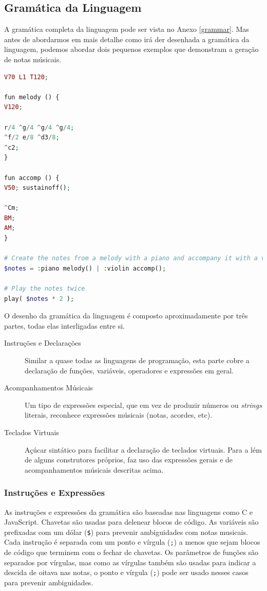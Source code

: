\subsection{Gramática da Linguagem}
A gramática completa da linguagem pode ser vista no Anexo \ref{grammar}. Mas antes de abordarmos em mais detalhe como irá der desenhada a gramática da linguagem, podemos abordar dois pequenos exemplos que demonstram a geração de notas músicais.
\begin{lstlisting}[caption=Exemplo da sintaxe proposta da linguagem,language=PHP]
V70 L1 T120;

fun melody () {
V120;

r/4 ^g/4 ^g/4 ^g/4;
^f/2 e/8 ^d3/8; 
^c2;
}

fun accomp () {
V50; sustainoff();

^Cm;
BM; 
AM;
}

# Create the notes from a melody with a piano and accompany it with a violin in parallel
$notes = :piano melody() | :violin accomp();

# Play the notes twice
play( $notes * 2 );
\end{lstlisting}

O desenho da gramática da linguagem é composto aproximadamente por três partes, todas elas interligadas entre si.
\begin{description}
    \item[Instruções e Declarações] Similar a quase todas as linguagens de programação, esta parte cobre a declaração de funções, variáveis, operadores e expressões em geral.
    \item[Acompanhamentos Músicais] Um tipo de expressões especial, que em vez de produzir números ou \textit{strings} literais, reconhece expressões músicais (notas, acordes, etc).
    \item[Teclados Virtuais] Açúcar sintático para facilitar a declaração de teclados virtuais. Para a lém de alguns construtores próprios, faz uso das expressões gerais e de acompanhamentos músicais descritas acima.
\end{description}

\subsubsection{Instruções e Expressões}
As instruções e expressões da gramática são baseadas nas linguagens como C e JavaScript. Chavetas são usadas para delenear blocos de código. As variáveis são prefixadas com um dólar (\texttt{\$}) para prevenir ambiguidades com notas musicais. Cada instrução é separada com um ponto e vírgula (\texttt{;}) a menos que sejam blocos de código que terminem com o fechar de chavetas. Os parâmetros de funções são separados por vírgulas, mas como as vírgulas também são usadas para indicar a descida de oitava nas notas, o ponto e vírgula (\texttt{;}) pode ser usado nesses casos para prevenir ambiguidades.

